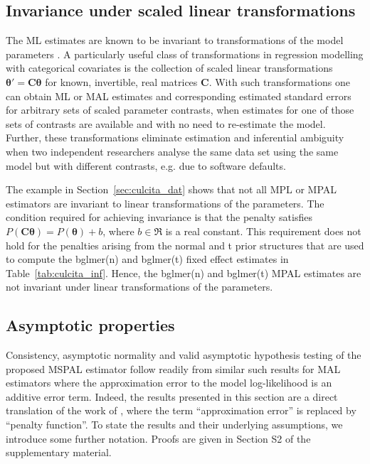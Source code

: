 \documentclass[11pt, a4paper]{article}
\newcommand*{\bb}{\boldsymbol}
\theoremstyle{example} \newtheorem{example}{Example}[section]
\theoremstyle{theorem} \newtheorem{theorem}{Theorem}[section]
\def\btheta{\bb{\theta}}
\def\bC{\bb{C}}
\begin{document}
\subsection{Invariance under scaled linear transformations}

The ML estimates are known to be invariant to transformations of the
model parameters \citep[see, for example][]{zehna:1966}. A
particularly useful class of transformations in regression modelling
with categorical covariates is the collection of scaled linear transformations
$\btheta' = \bC \btheta$ for known, invertible, real matrices
$\bC$. With such transformations one can obtain ML or MAL estimates and corresponding
estimated standard errors for arbitrary sets of scaled parameter
contrasts, when estimates for one of those sets of contrasts are
available and with no need to re-estimate the model. Further, these transformations eliminate estimation and
inferential ambiguity when two independent researchers analyse the
same data set using the same model but with different contrasts,
e.g. due to software defaults.

The example in Section~\ref{sec:culcita_dat} shows that not all MPL or
MPAL estimators are invariant to linear transformations of the
parameters. The condition required for achieving invariance is that
the penalty satisfies $P(\bC\btheta) = P(\btheta) + b$, where
$b \in \Re$ is a real constant. This requirement does not hold for
the penalties arising from the normal and t prior structures that are
used to compute the bglmer(n) and bglmer(t) fixed effect estimates in Table~\ref{tab:culcita_inf}. Hence, the bglmer(n) and
bglmer(t) MPAL estimates are not invariant under linear
transformations of the parameters.

\subsection{Asymptotic properties}
\label{sec:ass+res}

Consistency, asymptotic normality and valid asymptotic hypothesis testing of the proposed MSPAL estimator follow readily from similar such results for MAL estimators where the approximation error to the model log-likelihood is an additive error term. Indeed, the results presented in this section are a direct translation of the work of \citet{ogden:2017}, where the term ``approximation error'' is replaced by ``penalty function''. To state the results and their underlying assumptions, we introduce some further notation. Proofs are given in Section S2 of the supplementary material.
\end{document}
